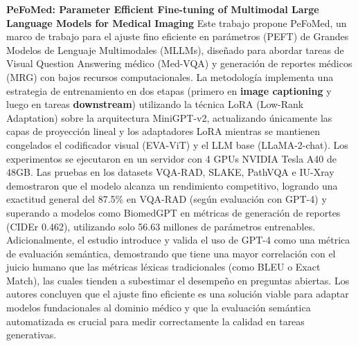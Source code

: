 \documentclass[11pt, a4paper]{article}
\begin{document}
\textbf{PeFoMed: Parameter Efficient Fine-tuning of Multimodal Large Language Models for Medical Imaging} \cite{he_pefomed_2025}
Este trabajo propone PeFoMed, un marco de trabajo para el ajuste fino eficiente en parámetros (PEFT) de Grandes Modelos de Lenguaje Multimodales (MLLMs), diseñado para abordar tareas de Visual Question Answering médico 
(Med-VQA) y generación de reportes médicos (MRG) con bajos recursos computacionales. La metodología implementa una estrategia de entrenamiento en dos etapas (primero en \textbf{image captioning} y luego en tareas \textbf{downstream})
utilizando la técnica LoRA (Low-Rank Adaptation) sobre la arquitectura MiniGPT-v2, actualizando únicamente las capas de proyección lineal y los adaptadores LoRA mientras se mantienen congelados el codificador visual (EVA-ViT)
y el LLM base (LLaMA-2-chat). Los experimentos se ejecutaron en un servidor con 4 GPUs NVIDIA Tesla A40 de 48GB. Las pruebas en los datasets VQA-RAD, SLAKE, PathVQA e IU-Xray demostraron que el modelo alcanza un rendimiento
competitivo, logrando una exactitud general del 87.5\% en VQA-RAD (según evaluación con GPT-4) y superando a modelos como BiomedGPT en métricas de generación de reportes (CIDEr 0.462), utilizando solo 56.63 millones de
parámetros entrenables. Adicionalmente, el estudio introduce y valida el uso de GPT-4 como una métrica de evaluación semántica, demostrando que tiene una mayor correlación con el juicio humano que las métricas léxicas
tradicionales (como BLEU o Exact Match), las cuales tienden a subestimar el desempeño en preguntas abiertas. Los autores concluyen que el ajuste fino eficiente es una solución viable para adaptar modelos fundacionales al
dominio médico y que la evaluación semántica automatizada es crucial para medir correctamente la calidad en tareas generativas.
\end{document}
